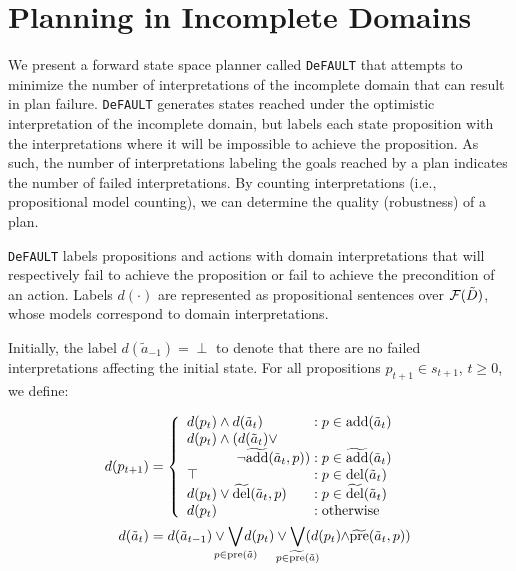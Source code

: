 \documentclass{article}
\def\und#1{\noindent{\bf #1}:}
\def\FFRISKY{{\tt DeFAULT}}
\def\und#1{\medskip{\noindent\bf #1:}}
\begin{document}
\section{Planning in Incomplete Domains}

We present a forward state space planner called \FFRISKY{} that attempts to minimize the number of interpretations of the incomplete domain that can result in plan failure.  \FFRISKY{} generates states reached under the optimistic interpretation of the incomplete domain, but labels each state proposition with the interpretations where it will be impossible to achieve the proposition.  As such, the number of interpretations labeling the goals reached by a plan indicates the number of failed interpretations.  By counting interpretations (i.e., propositional model counting), we can determine the quality (robustness) of a plan.

\und{Label Propagation}  \FFRISKY{} labels propositions and actions with domain interpretations that will respectively fail to achieve the proposition or fail to achieve the precondition of an action.  Labels $d(\cdot)$ are represented as  propositional sentences over ${\cal F}(\tilde{D})$, whose models correspond to domain interpretations.  

Initially, the label $d(\tilde{a}_{-1}) = \perp$ to denote that there are no failed interpretations affecting the initial state.  For all propositions $p_{t+1} \in s_{t+1}$, $t \geq 0$, we define: 

 \begin{align}
\hspace*{-.1cm}d(p_{t+1}) &= \left\{
\begin{array}{l@{\;}l@{\;}r}
d(p_t) \wedge d(\tilde{a}_t) & : p \in \text{add}(\tilde{a}_t) \\
d(p_t) \wedge  (d(\tilde{a}_t) \vee \\
\hspace*{1.25cm} \neg\widetilde{\text{add}}(\tilde{a}_t, p)) & : p \in \widetilde{\text{add}}(\tilde{a}_t)\\
\top & : p \in \text{del}(\tilde{a}_t)\\
d(p_t) \vee  \widetilde{\text{del}}(\tilde{a}_t, p) %
 &: p \in \widetilde{\text{del}}(\tilde{a}_t)\\
d(p_t) & : \text{otherwise} 
\end{array}
\right. \\
d(\tilde{a}_t) &=  
d(\tilde{a}_{t-1}) \vee \hspace*{-.35cm}\bigvee\limits_{p \in \text{pre}(\tilde{a})}\hspace*{-.39cm} d(p_t) \vee\hspace*{-.35cm} \bigvee\limits_{p \in \widetilde{\text{pre}}(\tilde{a})} \hspace*{-.35cm}(d(p_t)\hspace*{-.09cm}\wedge\hspace*{-.09cm} \widetilde{\text{pre}}(\tilde{a}_t, p)  ) %
\end{align}
\end{document}
